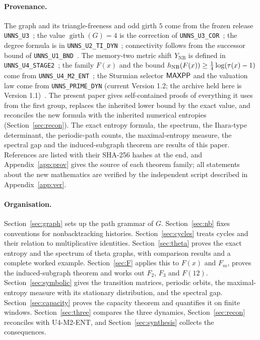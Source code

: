 \paragraph{Provenance.} The graph and its triangle-freeness and odd girth $5$ come from the frozen release \texttt{UNNS\_U3}~\cite{UTHREE}; the value $\operatorname{girth}(G)=4$ is the correction of \texttt{UNNS\_U3\_COR}~\cite{UCOR}; the degree formula is in \texttt{UNNS\_U2\_TI\_DYN}~\cite{UTI}; connectivity follows from the successor bound of \texttt{UNNS\_U1\_BND}~\cite{UBND}. The memory-two metric shift $Y_{\mathrm{NB}}$ is defined in \texttt{UNNS\_U4\_STAGE2}~\cite{USTAGE}; the family $F(x)$ and the bound $h_{\mathrm{NB}}(F(x))\ge\tfrac14\log(\tau(x)-1)$ come from \texttt{UNNS\_U4\_M2\_ENT}~\cite{UENT}; the Sturmian selector $\textsf{MAXPP}$ and the valuation law come from \texttt{UNNS\_PRIME\_DYN} (current Version 1.2; the archive held here is Version 1.1)~\cite{PD}. The present paper gives self-contained proofs of everything it uses from the first group, replaces the inherited lower bound by the exact value, and reconciles the new formula with the inherited numerical entropies (Section~\ref{sec:recon}). The exact entropy formula, the spectrum, the Ihara-type determinant, the periodic-path counts, the maximal-entropy measure, the spectral gap and the induced-subgraph theorem are results of this paper. References are listed with their SHA-256 hashes at the end, and Appendix~\ref{app:prov} gives the source of each theorem family; all statements about the new mathematics are verified by the independent script described in Appendix~\ref{app:ver}.

\paragraph{Organisation.} Section~\ref{sec:graph} sets up the path grammar of $G$. Section~\ref{sec:nb} fixes conventions for nonbacktracking histories. Section~\ref{sec:cycles} treats cycles and their relation to multiplicative identities. Section~\ref{sec:theta} proves the exact entropy and the spectrum of theta graphs, with comparison results and a complete worked example. Section~\ref{sec:F} applies this to $F(x)$ and $F_m$, proves the induced-subgraph theorem and works out $F_2$, $F_3$ and $F(12)$. Section~\ref{sec:symbolic} gives the transition matrices, periodic orbits, the maximal-entropy measure with its stationary distribution, and the spectral gap. Section~\ref{sec:capacity} proves the capacity theorem and quantifies it on finite windows. Section~\ref{sec:three} compares the three dynamics, Section~\ref{sec:recon} reconciles with U4-M2-ENT, and Section~\ref{sec:synthesis} collects the consequences.
